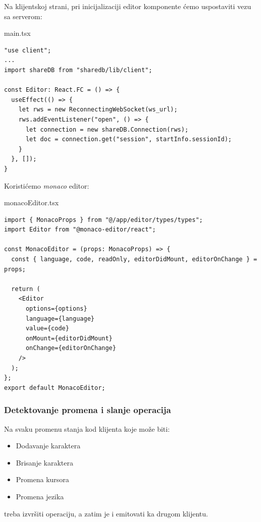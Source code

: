 \documentclass[12pt]{article}
\begin{document}
Na klijentskoj strani, pri inicijalizaciji editor komponente ćemo uspostaviti vezu sa serverom:

\begin{mylisting}[label={lst:example}]{main.tsx}
\begin{lstlisting}
"use client";
...
import shareDB from "sharedb/lib/client";

const Editor: React.FC = () => {
  useEffect(() => {
    let rws = new ReconnectingWebSocket(ws_url);
    rws.addEventListener("open", () => {
      let connection = new shareDB.Connection(rws);
      let doc = connection.get("session", startInfo.sessionId);
    }
  }, []);
}
\end{lstlisting}
\end{mylisting}

Koristićemo \textit{monaco} editor\cite{monacoeditor}:

\begin{mylisting}[label={lst:example}]{monacoEditor.tsx}
\begin{lstlisting}
import { MonacoProps } from "@/app/editor/types/types";
import Editor from "@monaco-editor/react";

const MonacoEditor = (props: MonacoProps) => {
  const { language, code, readOnly, editorDidMount, editorOnChange } = props;

  return (
    <Editor
      options={options}
      language={language}
      value={code}
      onMount={editorDidMount}
      onChange={editorOnChange}
    />
  );
};
export default MonacoEditor;
\end{lstlisting}
\end{mylisting}

\subsubsection{Detektovanje promena i slanje operacija}

Na svaku promenu stanja kod klijenta koje može biti:

\begin{itemize}
    \item Dodavanje karaktera
    \item Brisanje karaktera
    \item Promena kursora
    \item Promena jezika
\end{itemize}

treba izvršiti operaciju, a zatim je i emitovati ka drugom klijentu.
\end{document}
